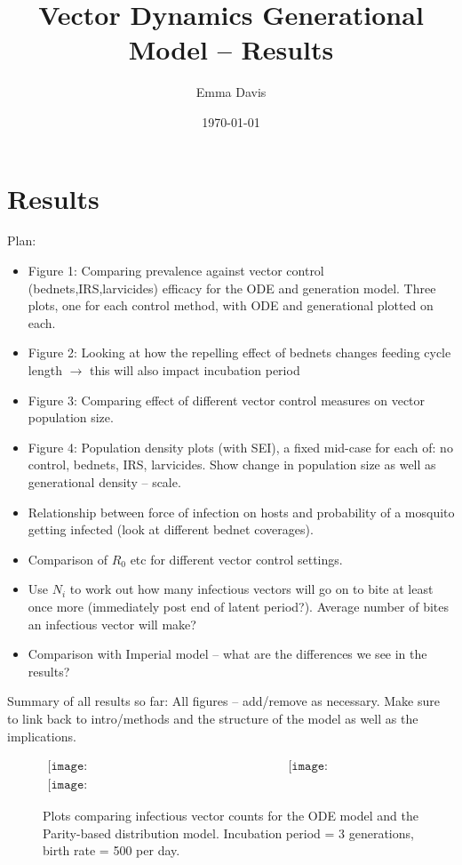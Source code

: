 \documentclass[a4paper,12pt]{article}
\begin{document}
\title{Vector Dynamics Generational Model -- Results}
\author{Emma Davis}
\date{\today}
\maketitle

\section{Results}

Plan:

\begin{itemize}
\item Figure 1: Comparing prevalence against vector control (bednets,IRS,larvicides) efficacy for the ODE and generation model. Three plots, one for each control method, with ODE and generational plotted on each.
\item Figure 2: Looking at how the repelling effect of bednets changes feeding cycle length $\rightarrow$ this will also impact incubation period
\item Figure 3: Comparing effect of different vector control measures on vector population size.
\item Figure 4: Population density plots (with SEI), a fixed mid-case for each of: no control, bednets, IRS, larvicides. Show change in population size as well as generational density -- scale.
\item Relationship between force of infection on hosts and probability of a mosquito getting infected (look at different bednet coverages).
\item Comparison of $R_0$ etc for different vector control settings.
\item Use $N_i$ to work out how many infectious vectors will go on to bite at least once more (immediately post end of latent period?). Average number of bites an infectious vector will make?
\item Comparison with Imperial model -- what are the differences we see in the results?
\end{itemize}

\noindent Summary of all results so far: All figures -- add/remove as necessary. Make sure to link back to intro/methods and the structure of the model as well as the implications.\\

\begin{figure}[h]$
\begin{array}{cc}
\texttt{[image: modelcomparison\_bednets\_zeros.pdf]}&
\texttt{[image: modelcomparison\_IRS\_zeros.pdf]}\\
\texttt{[image: modelcomparison\_larvicides\_zeros.pdf]}
\end{array}$
\caption{Plots comparing infectious vector counts for the ODE model and the Parity-based distribution model. Incubation period = 3 generations, birth rate = 500 per day.}
\label{fig:modelcomp}
\end{figure}
\end{document}

